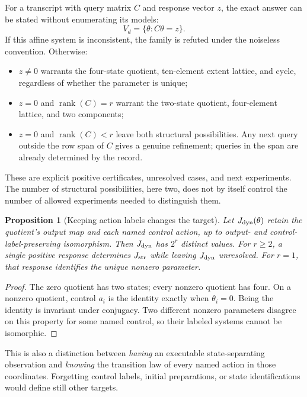 \documentclass[11pt]{article}
\newtheorem{proposition}[theorem]{Proposition}
\theoremstyle{definition}
\begin{document}
For a transcript with query matrix $C$ and response vector $z$, the exact
answer can be stated without enumerating its models:
\begin{equation}
 V_d=\{\theta:C\theta=z\}.
 \label{eq:er-affine}
\end{equation}
If this affine system is inconsistent, the family is refuted under the
noiseless convention. Otherwise:
\begin{itemize}
\item $z\ne0$ warrants the four-state quotient, ten-element extent lattice,
and cycle, regardless of whether the parameter is unique;
\item $z=0$ and $\operatorname{rank}(C)=r$ warrant the two-state quotient,
four-element lattice, and two components;
\item $z=0$ and $\operatorname{rank}(C)<r$ leave both structural possibilities.
Any next query outside the row span of $C$ gives a genuine refinement;
queries in the span are already determined by the record.
\end{itemize}
These are explicit positive certificates, unresolved cases, and next
experiments. The number of structural possibilities, here two, does not by
itself control the number of allowed experiments needed to distinguish them.

\begin{proposition}[Keeping action labels changes the target]
\label{prop:er-labels}
Let $J_{\rm dyn}(\theta)$ retain the quotient's output map and each named
control action, up to output- and control-label-preserving isomorphism.
Then $J_{\rm dyn}$ has $2^r$ distinct values. For $r\ge2$, a single positive
response determines $J_{\rm str}$ while leaving $J_{\rm dyn}$ unresolved.
For $r=1$, that response identifies the unique nonzero parameter.
\end{proposition}
\begin{proof}
The zero quotient has two states; every nonzero quotient has four. On a
nonzero quotient, control $a_i$ is the identity exactly when $\theta_i=0$.
Being the identity is invariant under conjugacy. Two different nonzero
parameters disagree on this property for some named control, so their
labeled systems cannot be isomorphic.
\end{proof}

This is also a distinction between \emph{having} an executable state-separating
observation and \emph{knowing} the transition law of every named action in
those coordinates. Forgetting control labels, initial preparations, or
state identifications would define still other targets.
\end{document}
